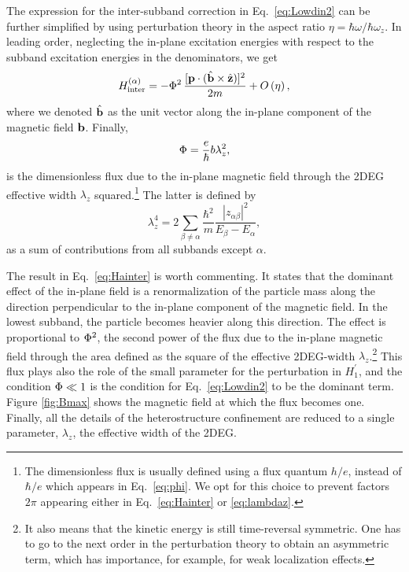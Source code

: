 \documentclass[aps,floatfix,twocolumn,showpacs,10pt,nofootinbib]{revtex4-1}
\newcommand{\be}{\begin{equation}}
\newcommand{\ee}{\end{equation}}
\begin{document}
The expression for the inter-subband correction in Eq.~\eqref{eq:Lowdin2} can be further simplified by using perturbation theory  in the aspect ratio $\eta=\hbar \omega / \hbar \omega_z$. In leading order, neglecting the in-plane excitation energies with respect to the subband excitation energies in the denominators, we get
\be
H^{(\alpha)}_\textrm{inter} = -\flux^2 \, \frac{[\Pin \cdot (\Binunit \times \z ) ]^2}{2m}  + O\left(\eta \right),
\label{eq:Hainter}
\ee
where we denoted $\hat{\textbf{b}}$ as the unit vector along the in-plane component of the magnetic field $\textbf{b}$.
Finally, 
\be
\flux = \frac{e}{\hbar} \Binscalar  \lambda_z^2,
\label{eq:phi}
\ee
is the dimensionless flux due to the in-plane magnetic field through the 2DEG effective width $\lambda_z$  squared.\footnote{The dimensionless flux is usually defined using a flux quantum $h/e$, instead of $\hbar/e$ which appears in Eq.~\eqref{eq:phi}. We opt for this choice to prevent factors $2\pi$ appearing either in Eq.~\eqref{eq:Hainter} or \eqref{eq:lambdaz}.}
The latter is defined by\cite{stern1968:PRL}
\be
\lambda_z^{4}= 2{\sum_{\beta \neq \alpha}} \frac{\hbar^2}{m} \frac{|z_{\alpha \beta}|^2}{E_\beta-E_\alpha},
\label{eq:lambdaz}
\ee
as a sum of contributions from all subbands except $\alpha$.

The result in Eq.~\eqref{eq:Hainter} is worth commenting. It states that the dominant effect of the in-plane field is a renormalization of the particle mass along the direction perpendicular to the in-plane component of the magnetic field. In the lowest subband, the particle becomes heavier along this direction. The effect is proportional to $\Phi^2$, the second power of the flux due to the in-plane magnetic field through the area defined as the square of the  effective 2DEG-width $\lambda_z$.\footnote{It also means that the kinetic energy is still time-reversal symmetric. One has to go to the next order in the perturbation theory to obtain an asymmetric term, which has importance, for example, for weak localization effects.\cite{falko2002:PRB}} This flux plays also the role of the small parameter for the perturbation in $H_1^\prime$, and the condition $\Phi \ll 1$ is the condition for Eq.~\eqref{eq:Lowdin2} to be the dominant term. Figure \ref{fig:Bmax} shows the magnetic field at which the flux becomes one. 
Finally, all the details of the heterostructure confinement are reduced to a single parameter, $\lambda_z$, the effective width of the 2DEG.
\end{document}
